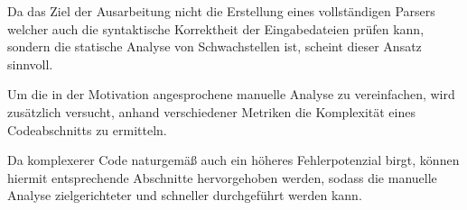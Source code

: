        Da das Ziel der Ausarbeitung nicht die Erstellung eines vollständigen Parsers welcher auch die syntaktische Korrektheit der Eingabedateien prüfen kann,
        sondern die statische Analyse von Schwachstellen ist,
        scheint dieser Ansatz sinnvoll.

        Um die in der Motivation angesprochene manuelle Analyse zu vereinfachen,
        wird zusätzlich versucht,
        anhand verschiedener Metriken die Komplexität eines Codeabschnitts zu ermitteln.

        Da komplexerer Code naturgemäß auch ein höheres Fehlerpotenzial birgt,
        können hiermit entsprechende Abschnitte hervorgehoben werden,
        sodass die manuelle Analyse zielgerichteter und
        schneller durchgeführt werden kann.
